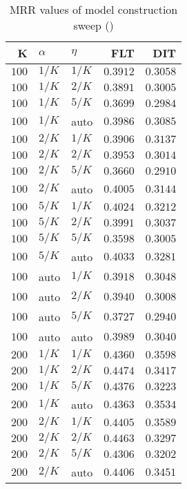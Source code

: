 
\begin{table}
\begin{spacing}{1.2}
\centering
\caption{MRR values of \zookeeper model construction sweep (\cone)}
\label{table:zookeeper_model_sweep}
\vspace{0.2em}
\parbox{.45\linewidth}{\centering \begin{tabular}{rll|rr}
\toprule
    K &  $\alpha$ &    $\eta$ &      FLT &      DIT \\
\midrule
$100$ &  $1/K$ &  $1/K$ & $0.3912$ & $0.3058$ \\
$100$ &  $1/K$ &  $2/K$ & $0.3891$ & $0.3005$ \\
$100$ &  $1/K$ &  $5/K$ & $0.3699$ & $0.2984$ \\
$100$ &  $1/K$ &   auto & $0.3986$ & $0.3085$ \\
$100$ &  $2/K$ &  $1/K$ & $0.3906$ & $0.3137$ \\
$100$ &  $2/K$ &  $2/K$ & $0.3953$ & $0.3014$ \\
$100$ &  $2/K$ &  $5/K$ & $0.3660$ & $0.2910$ \\
$100$ &  $2/K$ &   auto & $0.4005$ & $0.3144$ \\
$100$ &  $5/K$ &  $1/K$ & $0.4024$ & $0.3212$ \\
$100$ &  $5/K$ &  $2/K$ & $0.3991$ & $0.3037$ \\
$100$ &  $5/K$ &  $5/K$ & $0.3598$ & $0.3005$ \\
$100$ &  $5/K$ &   auto & $0.4033$ & $0.3281$ \\
$100$ &   auto &  $1/K$ & $0.3918$ & $0.3048$ \\
$100$ &   auto &  $2/K$ & $0.3940$ & $0.3008$ \\
$100$ &   auto &  $5/K$ & $0.3727$ & $0.2940$ \\
$100$ &   auto &   auto & $0.3989$ & $0.3040$ \\
$200$ &  $1/K$ &  $1/K$ & $0.4360$ & $0.3598$ \\
$200$ &  $1/K$ &  $2/K$ & $0.4474$ & $0.3417$ \\
$200$ &  $1/K$ &  $5/K$ & $0.4376$ & $0.3223$ \\
$200$ &  $1/K$ &   auto & $0.4363$ & $0.3534$ \\
$200$ &  $2/K$ &  $1/K$ & $0.4405$ & $0.3589$ \\
$200$ &  $2/K$ &  $2/K$ & $0.4463$ & $0.3297$ \\
$200$ &  $2/K$ &  $5/K$ & $0.4306$ & $0.3202$ \\
$200$ &  $2/K$ &   auto & $0.4406$ & $0.3451$ \\

\end{tabular}}
\end{spacing}
\end{table}
